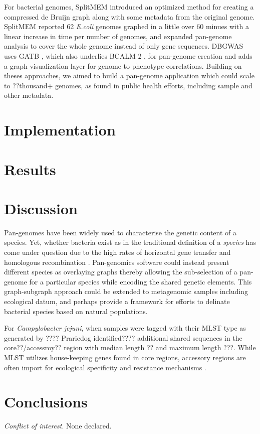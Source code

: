 \documentclass{article}
\begin{document}
For bacterial genomes, SplitMEM \cite{marcus2014splitmem} introduced an optimized method for creating a compressed de Bruijn graph along with some metadata from the original genome.
SplitMEM reported 62 \textit{E.coli} genomes graphed in a little over 60 minues with a linear increase in time per number of genomes, and expanded pan-genome analysis to cover the whole genome instead of only gene sequences.
DBGWAS \cite{jaillard2018fast} uses GATB \cite{drezen2014gatb}, which also underlies BCALM 2 \cite{chikhi2016compacting}, for pan-genome creation and adds a graph visualization layer for genome to phenotype correlations.
Building on theses approaches, we aimed to build a pan-genome application which could scale to ??thousand+ genomes, as found in public health efforts, including sample and other metadata.

\section{Implementation}

\section{Results}

\section{Discussion}

Pan-genomes have been widely used to characterise the genetic content of a species.
Yet, whether bacteria exist as in the traditional definition of a \textit{species} has come under question due to the high rates of horizontal gene transfer and homologous recombination \cite{fraser2009bacterial}.
Pan-genomics software could instead present different species as overlaying graphs thereby allowing the sub-selection of a pan-genome for a particular species while encoding the shared genetic elements.
This graph-subgraph approach could be extended to metagenomic samples including ecological datum, and perhaps provide a framework for efforts \cite{caro2012bacterial} to delinate bacterial species based on natural populations.


For \textit{Campylobacter jejuni}, when samples were tagged with their MLST type as generated by ???? Prariedog identified???? additional shared sequences in the core??/accessroy?? region with median length ?? and maximum length ???. %
While MLST utilizes house-keeping genes found in core regions, accessory regions are often import for ecological specificity and resistance mechanisms \cite{fraser2009bacterial}.

\section{Conclusions}


\textit{Conflict of interest}. None declared.

\newpage



\end{document}
